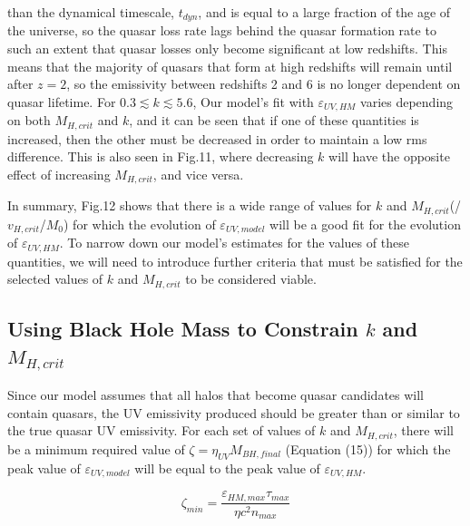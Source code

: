 \documentclass[12pt, twocolumn]{report}%
\begin{document}
\noindent than the dynamical timescale, $t_{dyn}$, and is equal to a large fraction of the age of the universe, so the quasar loss rate lags behind the quasar formation rate to such an extent that quasar losses only become significant at low redshifts. This means that the majority of quasars that form at high redshifts will remain until after $z=2$, so the emissivity between redshifts 2 and 6 is no longer dependent on quasar lifetime. For $0.3\lesssim k\lesssim5.6$, Our model's fit with $\varepsilon_{UV,HM}$ varies depending on both $M_{H,crit}$ and $k$, and it can be seen that if one of these quantities is increased, then the other must be decreased in order to maintain a low rms difference. This is also seen in Fig.11, where decreasing $k$ will have the opposite effect of increasing $M_{H,crit}$, and vice versa.\par

In summary, Fig.12 shows that there is a wide range of values for $k$ and $M_{H,crit}$(/$v_{H,crit}$/$M_0$) for which the evolution of $\varepsilon_{UV,model}$ will be a good fit for the evolution of $\varepsilon_{UV,HM}$. To narrow down our model's estimates for the values of these quantities, we will need to introduce further criteria that must be satisfied for the selected values of $k$ and $M_{H,crit}$ to be considered viable.

\subsection{Using Black Hole Mass to Constrain $k$ and $M_{H,crit}$}

Since our model assumes that all halos that become quasar candidates will contain quasars, the UV emissivity produced should be greater than or similar to the true quasar UV emissivity. For each set of values of $k$ and $M_{H,crit}$, there will be a minimum required value of $\zeta=\eta_{UV}M_{BH,final}$ (Equation (15)) for which the peak value of $\varepsilon_{UV,model}$ will be equal to the peak value of $\varepsilon_{UV,HM}$.

\begin{equation}
    \zeta_{min}=\frac{\varepsilon_{HM,max}\tau_{max}}{\eta c^2n_{max}}
\end{equation}
\end{document}
